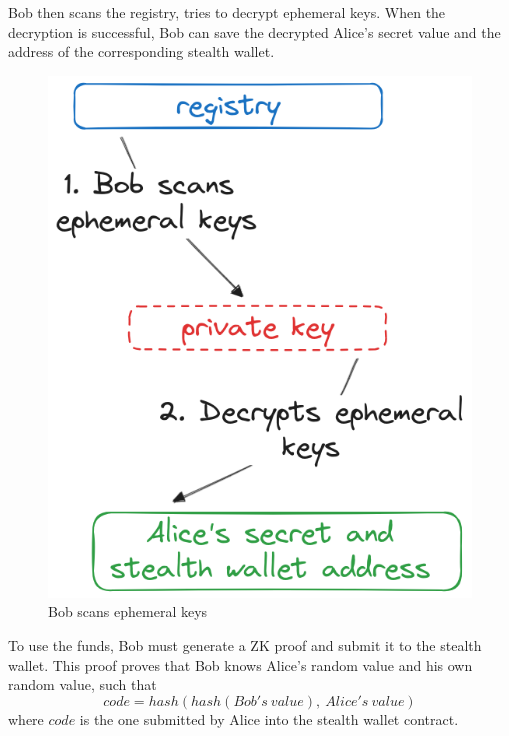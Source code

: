 \documentclass[conference,comsoc,10pt]{IEEEtran}
\begin{document}
    Bob then scans the registry, tries to decrypt ephemeral keys. When the
    decryption is successful, Bob can save the decrypted Alice's secret value
    and the address of the corresponding stealth wallet.

    \begin{figure}[h]
        \centering
        \includegraphics[scale=0.25]{./assets/images/scanning-ephemeral-keys.png}
        \caption{Bob scans ephemeral keys}
        \label{fig:scanning-ephemeral-keys}
    \end{figure}

    To use the funds, Bob must generate a ZK proof and submit it to the stealth
    wallet. This proof proves that Bob knows Alice's random value
    and his own random value, such that
    \[ code = hash(hash(Bob's\:value),\:Alice's\:value) \]
    where $code$ is the one submitted by Alice into the stealth wallet contract.
\end{document}
